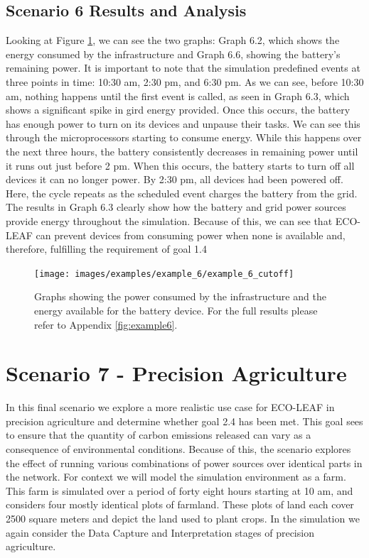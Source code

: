 \documentclass{l4proj}
\begin{document}
\subsection{Scenario 6 Results and Analysis}
Looking at Figure \ref{fig:example6_results}, we can see the two graphs: Graph 6.2, which shows the energy consumed by the infrastructure and Graph 6.6, showing the battery's remaining power.
It is important to note that the simulation predefined events at three points in time: 10:30 am, 2:30 pm, and 6:30 pm.
As we can see, before 10:30 am, nothing happens until the first event is called, as seen in Graph 6.3, which shows a significant spike in gird energy provided.
Once this occurs, the battery has enough power to turn on its devices and unpause their tasks.
We can see this through the microprocessors starting to consume energy.
While this happens over the next three hours, the battery consistently decreases in remaining power until it runs out just before 2 pm.
When this occurs, the battery starts to turn off all devices it can no longer power.
By 2:30 pm, all devices had been powered off. Here, the cycle repeats as the scheduled event charges the battery from the grid.
The results in Graph 6.3 clearly show how the battery and grid power sources provide energy throughout the simulation.
Because of this, we can see that ECO-LEAF can prevent devices from consuming power when none is available and, therefore, fulfilling the requirement of goal 1.4

\begin{figure}[h]
    \centering
    \texttt{[image: images/examples/example\_6/example\_6\_cutoff]}
    ~
    \caption{Graphs showing the power consumed by the infrastructure and the energy available for the battery device. For the full results please refer to Appendix \ref{fig:example6}.}
    \label{fig:example6_results}
\end{figure}

\section{Scenario 7 - Precision Agriculture}\label{eval:subsec:scenario 7}
In this final scenario we explore a more realistic use case for ECO-LEAF in precision agriculture and determine whether goal 2.4 has been met.
This goal sees to ensure that the quantity of carbon emissions released can vary as a consequence of environmental conditions.
Because of this, the scenario explores the effect of running various combinations of power sources over identical parts in the network.
For context we will model the simulation environment as a farm.
This farm is simulated over a period of forty eight hours starting at 10 am, and considers four mostly identical plots of farmland.
These plots of land each cover 2500 square meters and depict the land used to plant crops.
In the simulation we again consider the Data Capture and Interpretation stages of precision agriculture.
\end{document}

